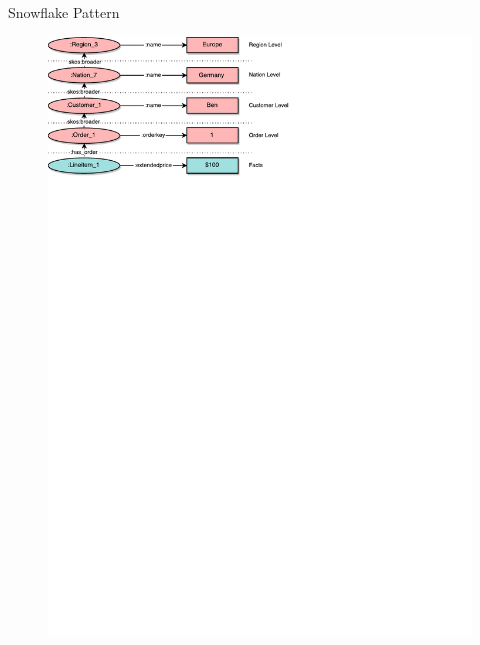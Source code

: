 \begin{frame}{\patsec}{Snowflake Pattern}
    \begin{figure}
        \includegraphics[trim=0 648 255 0,clip,width=1\textwidth]{images/snowflakepattern.pdf}
    \end{figure}
\end{frame}

